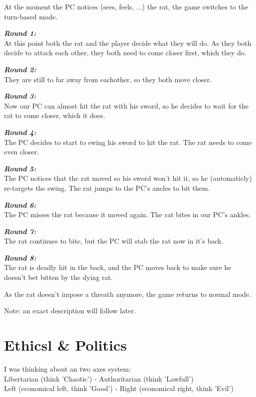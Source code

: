 \documentclass[a4paper]{report}
\newcommand{\nadruk }[1]{\textbf{\emph{#1}}}
\begin{document}
			At the moment the PC notices (sees, feels, ...) the rat, the game switches to  the turn-based mode. 

			\nadruk{Round 1:} \\
			At this point both the rat and the player decide what they will do. As they both decide to attack each other, they both need to come closer first, which they do.

			\nadruk{Round 2:} \\
			They are still to far away from eachother, so they both move closer.

			\nadruk{Round 3:} \\
			Now our PC can almost hit the rat with his sword, so he decides to wait for the rat to come closer, which it does.

			\nadruk{Round 4:} \\
			The PC decides to start to swing his sword to hit the rat. The rat needs to come even closer.

			\nadruk{Round 5:} \\
			The PC notices that the rat moved so his sword won't hit it, so  he (automaticly) re-targets the swing. The rat jumps to the PC's ancles to bit them.

			\nadruk{Round 6:} \\
			The PC misses the rat because it moved again. The rat bites in our PC's ankles. 

			\nadruk{Round 7:} \\
			The rat continues to bite, but the PC will stab the rat now in it's back.

			\nadruk{Round 8:} \\
			The rat is deadly hit in the back, and the PC moves back to make sure he doesn't bet bitten by the dying rat.

			As the rat doesn't impose a threath anymore, the game returns to normal mode.

		Note: an exact description will follow later.

	\chapter{Ethicsl \& Politics}

		I was thinking about an two axes system: \\
		Libertarian (think 'Chaotic') - Authoritarian (think 'Lawfull') \\
		Left (economical left, think 'Good') - Right (economical right, think 'Evil')
\end{document}
